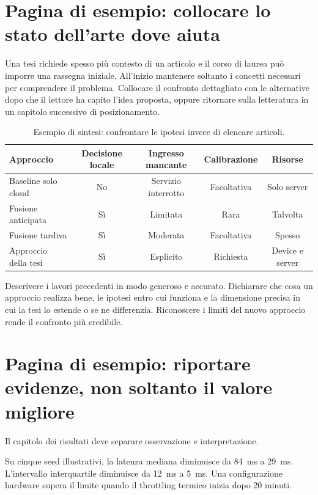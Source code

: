 \clearpage
\section{Pagina di esempio: collocare lo stato dell'arte dove aiuta}
Una tesi richiede spesso più contesto di un articolo e il corso di laurea può
imporre una rassegna iniziale. All'inizio mantenere soltanto i concetti necessari
per comprendere il problema. Collocare il confronto dettagliato con le
alternative dopo che il lettore ha capito l'idea proposta, oppure ritornare
sulla letteratura in un capitolo successivo di posizionamento.

\begin{table}[htbp]
\centering
\caption{Esempio di sintesi: confrontare le ipotesi invece di elencare articoli.}
\label{tab:guide-related-it}
\begin{tabularx}{\textwidth}{Ycccc}
\toprule
Approccio & Decisione locale & Ingresso mancante & Calibrazione & Risorse\\
\midrule
Baseline solo cloud & No & Servizio interrotto & Facoltativa & Solo server\\
Fusione anticipata & Sì & Limitata & Rara & Talvolta\\
Fusione tardiva & Sì & Moderata & Facoltativa & Spesso\\
Approccio della tesi & Sì & Esplicito & Richiesta & Device e server\\
\bottomrule
\end{tabularx}
\end{table}

Descrivere i lavori precedenti in modo generoso e accurato. Dichiarare che cosa
un approccio realizza bene, le ipotesi entro cui funziona e la dimensione precisa
in cui la tesi lo estende o se ne differenzia. Riconoscere i limiti del nuovo
approccio rende il confronto più credibile.

\section{Pagina di esempio: riportare evidenze, non soltanto il valore migliore}
Il capitolo dei risultati deve separare osservazione e interpretazione.

\begin{resultbox}[Osservazione]
Su cinque seed illustrativi, la latenza mediana diminuisce da 84~ms a 29~ms.
L'intervallo interquartile diminuisce da 12~ms a 5~ms. Una configurazione
hardware supera il limite quando il throttling termico inizia dopo 20 minuti.
\end{resultbox}

